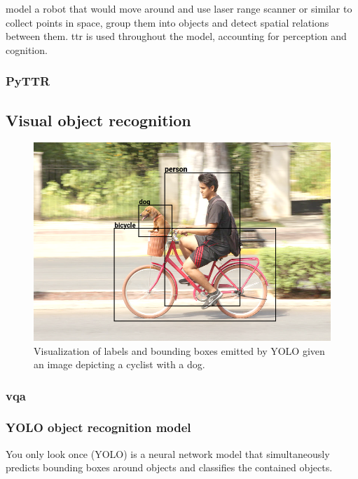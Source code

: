 \documentclass[11pt, a4paper]{article}
\begin{document}
\cite{DobnikModellinglanguageaction2012} model a robot that would move around and use laser range scanner or similar to collect points in space, group them into objects and detect spatial relations between them.
\Gls{ttr} is used throughout the model, accounting for perception and cognition.

\subsubsection{PyTTR}

\subsection{Visual object recognition}

\begin{figure}[h]
\label{fig:dogbike_annotated}
\includegraphics[width=\textwidth]{dogbike_annotated}
\centering
\caption{Visualization of labels and bounding boxes emitted by YOLO given an image depicting a cyclist with a dog.}
\end{figure}

\cite{Detectron2018}

\subsubsection{\Gls{vqa}}

\subsubsection{YOLO object recognition model}

You only look once (YOLO) \citep{RedmonYouOnlyLook2015} is a neural network model that simultaneously predicts bounding boxes around objects and classifies the contained objects.
\end{document}
